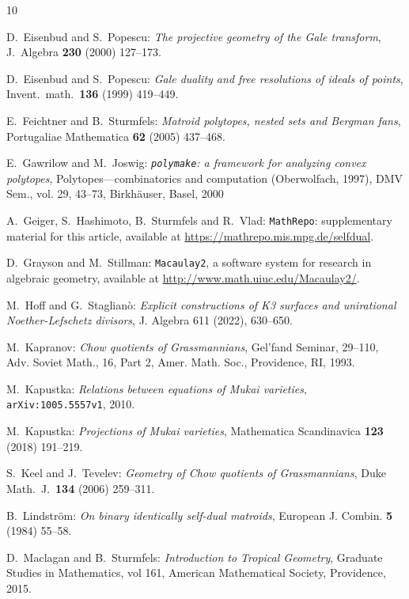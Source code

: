 \documentclass[12pt]{extarticle}
\theoremstyle{definition}
\numberwithin{theorem}{section}
\theoremstyle{plain}\newtheorem{ithm}{Theorem}
\begin{document}
\begin{thebibliography}{10}
\begin{small}
 D.~Eisenbud and S.~Popescu:
{\em  The projective geometry of the Gale transform},
J.~Algebra {\bf 230} (2000) 127--173. 

 D.~Eisenbud and S.~Popescu:
{\em  Gale duality and free resolutions
of ideals of points},
 Invent.~math.~{\bf 136} (1999) 419--449. 

 E.~Feichtner and B.~Sturmfels:
{\em Matroid polytopes, nested sets and Bergman fans},
Portugaliae Mathematica {\bf 62} (2005) 437--468.

 E.~Gawrilow and M.~Joswig: {\em {\tt polymake}: a framework for analyzing convex polytopes}, Polytopes---combinatorics and computation ({O}berwolfach, 1997), DMV Sem., vol. 29, 43--73, Birkh\"auser, Basel, 2000

 A.~Geiger, S.~Hashimoto, B.~Sturmfels and R.~Vlad: \texttt{MathRepo}:
supplementary material for this article, available at \url{https://mathrepo.mis.mpg.de/selfdual}.

 D.~Grayson  and M.~Stillman:  \texttt{Macaulay2}, a software system
for research in algebraic geometry, available at
\url{http://www.math.uiuc.edu/Macaulay2/}.

 M.~Hoff and G.~Staglian\`o: {\em
Explicit constructions of K3 surfaces and unirational Noether-Lefschetz divisors},
 J. Algebra 611 (2022), 630–650.

 M.~Kapranov: {\em Chow quotients of Grassmannians}, 
Gel'fand Seminar, 29--110, Adv. Soviet Math., 16, Part 2, Amer. Math. Soc., Providence, RI, 1993. 

 M.~Kapustka: {\em Relations between equations of Mukai varieties},
{\tt arXiv:1005.5557v1}, 2010.

 M.~Kapustka: {\em  Projections of Mukai varieties},
Mathematica Scandinavica {\bf 123} (2018) 191--219. 

S.~Keel and J.~Tevelev:
{\em Geometry of Chow quotients of Grassmannians},
Duke Math.~J.~{\bf 134} (2006) 259--311. 

 B.~Lindstr\"om: {\em On binary identically self-dual matroids}, European J. Combin. {\bf 5} (1984) 55--58. 

 D.~Maclagan and B.~Sturmfels: {\em 
Introduction to Tropical Geometry},  Graduate Studies in Mathematics, vol 161, 
American Mathematical Society, Providence, 2015. 



\end{small}
\end{thebibliography}
\end{document}
